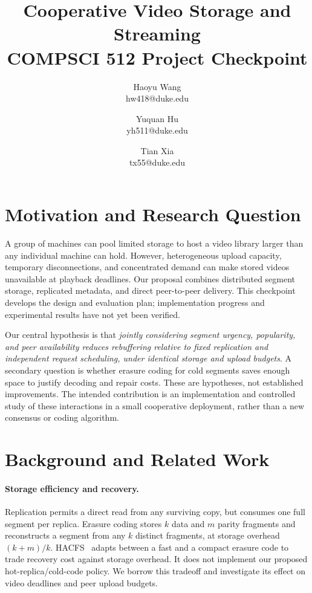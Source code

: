 \documentclass[letterpaper,twocolumn,10pt]{article}
\begin{document}
\date{}
\title{\Large\bf Cooperative Video Storage and Streaming\\COMPSCI 512 Project Checkpoint}
\author{{\rm Haoyu Wang}\\hw418@duke.edu
\and {\rm Yuquan Hu}\\yh511@duke.edu
\and {\rm Tian Xia}\\tx55@duke.edu}
\maketitle

\section{Motivation and Research Question}
A group of machines can pool limited storage to host a video library larger than any individual machine can hold. However, heterogeneous upload capacity, temporary disconnections, and concentrated demand can make stored videos unavailable at playback deadlines. Our proposal combines distributed segment storage, replicated metadata, and direct peer-to-peer delivery. This checkpoint develops the design and evaluation plan; implementation progress and experimental results have not yet been verified.

Our central hypothesis is that \emph{jointly considering segment urgency, popularity, and peer availability reduces rebuffering relative to fixed replication and independent request scheduling, under identical storage and upload budgets}. A secondary question is whether erasure coding for cold segments saves enough space to justify decoding and repair costs. These are hypotheses, not established improvements. The intended contribution is an implementation and controlled study of these interactions in a small cooperative deployment, rather than a new consensus or coding algorithm.

\section{Background and Related Work}
\paragraph{Storage efficiency and recovery.}
Replication permits a direct read from any surviving copy, but consumes one
full segment per replica. Erasure coding stores $k$ data and $m$ parity
fragments and reconstructs a segment from any $k$ distinct fragments, at
storage overhead $(k+m)/k$. HACFS~\cite{xia2015tale} adapts between a fast
and a compact erasure code to trade recovery cost against storage overhead.
It does not implement our proposed hot-replica/cold-code policy. We borrow
this tradeoff and investigate its effect on video deadlines and peer upload
budgets.
\end{document}
